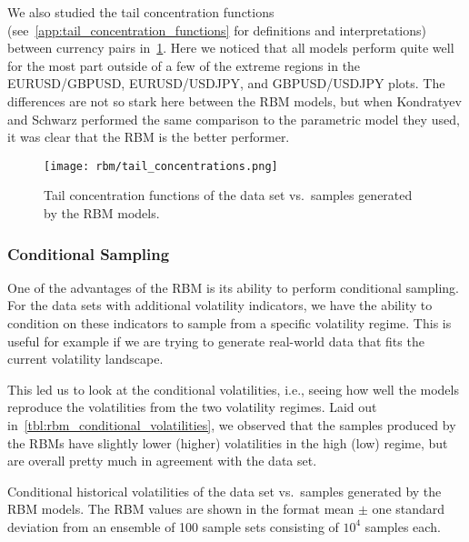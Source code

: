 We also studied the tail concentration functions (see~\cref{app:tail_concentration_functions} for definitions and interpretations) between currency pairs in~\cref{fig:rbm_tail_concentrations}.
Here we noticed that all models perform quite well for the most part outside of a few of the extreme regions in the EURUSD/GBPUSD, EURUSD/USDJPY, and GBPUSD/USDJPY plots.
The differences are not so stark here between the RBM models, but when Kondratyev and Schwarz performed the same comparison to the parametric model they used, it was clear that the RBM is the better performer.
\begin{figure}[!htb]
    \begin{center}
        \texttt{[image: rbm/tail\_concentrations.png]}
    \end{center}
    \caption{Tail concentration functions of the data set vs.~samples generated by the RBM models.}
    \label{fig:rbm_tail_concentrations}
\end{figure}

\subsubsection{Conditional Sampling}
One of the advantages of the RBM is its ability to perform conditional sampling.
For the data sets with additional volatility indicators, we have the ability to condition on these indicators to sample from a specific volatility regime.
This is useful for example if we are trying to generate real-world data that fits the current volatility landscape.

This led us to look at the conditional volatilities, i.e., seeing how well the models reproduce the volatilities from the two volatility regimes.
Laid out in~\cref{tbl:rbm_conditional_volatilities}, we observed that the samples produced by the RBMs have slightly lower (higher) volatilities in the high (low) regime, but are overall pretty much in agreement with the data set.
\begin{table}[!htb]
    \centering
    \begin{adjustbox}{max width=\textwidth}
        
    \end{adjustbox}
    \caption{Conditional historical volatilities of the data set vs.~samples generated by the RBM models. The RBM values are shown in the format mean \(\pm\) one standard deviation from an ensemble of 100 sample sets consisting of \( 10^4 \) samples each.}
    \label{tbl:rbm_conditional_volatilities}
\end{table}

